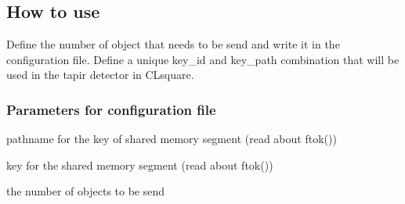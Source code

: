 \subsection{How to use}
\label{sec:mosm:howto}

Define the number of object that needs to be send and write it in the 
configuration file. Define a unique key\_id and key\_path combination 
that will be used in the tapir detector in CLsquare.

\subsubsection{Parameters for configuration file}
\label{sec:mosm:howto:params}

    \begin{description} \itemindent=-15pt
        \item[key\_path] pathname for the key of shared memory segment 
                (read about ftok())
        \item[key\_id] key for the shared memory segment (read about ftok())
        \item[nb\_objects] the number of objects to be send
    \end{description}
